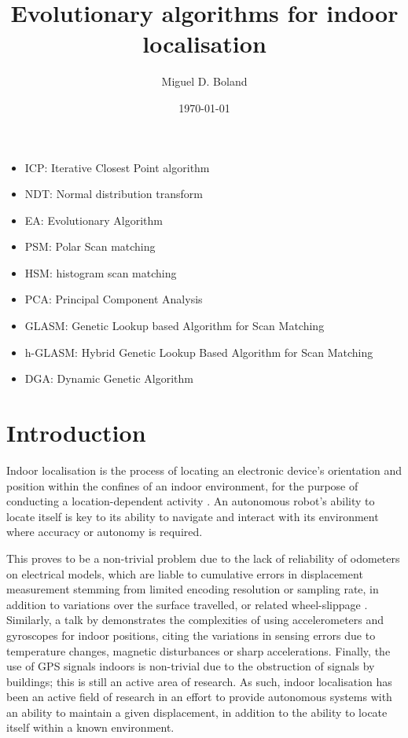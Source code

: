 \documentclass[authoryearcitations]{UoYCSproject}
\author{Miguel D. Boland}
\title{Evolutionary algorithms for indoor localisation}
\date{\today}
\begin{document}
\maketitle
\listoffigures
\listoftables
\clearpage
\lstlistoflistings
\begin{itemize}
	\item ICP: Iterative Closest Point algorithm
	\item NDT: Normal distribution transform
	\item EA: Evolutionary Algorithm
	\item PSM: Polar Scan matching
	\item HSM: histogram scan matching
	\item PCA: Principal Component Analysis
	\item GLASM: Genetic Lookup based Algorithm for Scan Matching
	\item h-GLASM: Hybrid Genetic Lookup Based Algorithm for Scan Matching
	\item DGA: Dynamic Genetic Algorithm
\end{itemize}


\chapter{Introduction}
\label{cha:Introduction}
Indoor localisation is the process of locating an electronic device's orientation and position within the confines of an indoor environment, for the purpose of conducting a location-dependent activity \cite{Curran2011-zs}. An autonomous robot's ability to locate itself is key to its ability to navigate and interact with its environment where accuracy or autonomy is required. 

This proves to be a non-trivial problem due to the lack of reliability of odometers on electrical models, which are liable to cumulative errors in displacement measurement stemming from limited encoding resolution or sampling rate, in addition to variations over the surface travelled, or related wheel-slippage \cite{Borenstein1996-al}. Similarly, a talk by \citet{Sachs2010-pw} demonstrates the complexities of using accelerometers and gyroscopes for indoor positions, citing the variations in sensing errors due to temperature changes, magnetic disturbances or sharp accelerations. Finally, the use of GPS signals indoors is non-trivial due to the obstruction of signals by buildings; this is still an active area of research\cite{Gowdayyanadoddi2015-hg}. As such, indoor localisation has been an active field of research in an effort to provide autonomous systems with an ability to maintain a given displacement, in addition to the ability to locate itself within a known environment. 
\end{document}
